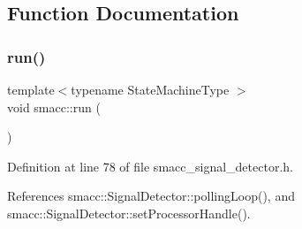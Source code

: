 \subsection{Function Documentation}
\mbox{\label{namespacesmacc_a47ac3b8d2968b1ba4152afd64ab66bd0}} 
\subsubsection{\texorpdfstring{run()}{run()}}
{\footnotesize\ttfamily template$<$typename State\+Machine\+Type $>$ \\
void smacc\+::run (\begin{DoxyParamCaption}{ }\end{DoxyParamCaption})}



Definition at line 78 of file smacc\+\_\+signal\+\_\+detector.\+h.



References smacc\+::\+Signal\+Detector\+::polling\+Loop(), and smacc\+::\+Signal\+Detector\+::set\+Processor\+Handle().


